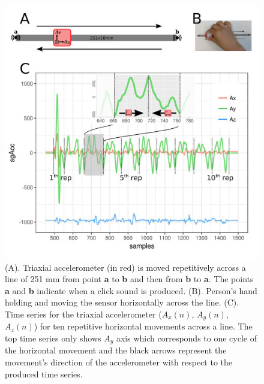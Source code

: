 \begin{figure}
 \centering
   \includegraphics[width=1.0\textwidth]{hmov}
   \caption{
	(A). Triaxial accelerometer (in red) is moved repetitively across a line
   	of 251 mm from point \textbf{a} to \textbf{b} and then from
   	\textbf{b} to \textbf{a}. 
   	The points \textbf{a} and \textbf{b} indicate when a click sound is produced.
	(B). Person's hand holding and moving the sensor horizontally across the line.
	(C). Time series for the triaxial accelerometer ($A_x(n)$, $A_y(n)$, $A_z(n)$) for
   ten repetitive horizontal movements across a line. The top time series only
   shows $A_y$ axis which corresponds to one cycle of the horizontal movement
	and the black arrows represent the movement's direction 
	of the accelerometer with respect to the produced time series.
	}
   \label{fig:acc}
\end{figure}







